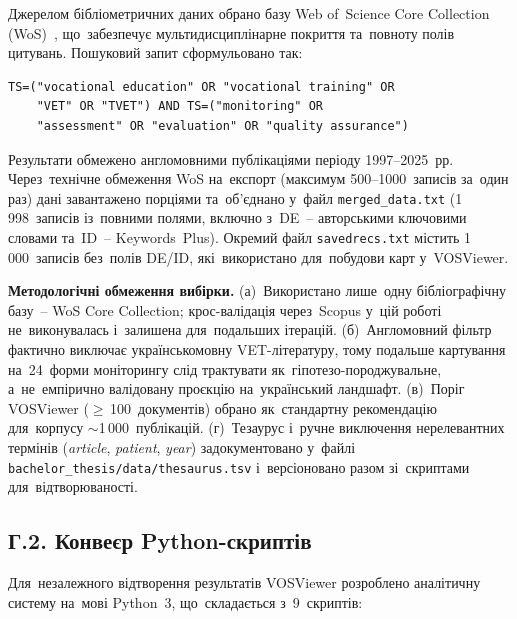 Джерелом бібліометричних даних обрано базу Web of~Science Core Collection (WoS)~\cite{Birkle2020}, що~забезпечує мультидисциплінарне покриття та~повноту полів цитувань. Пошуковий запит сформульовано так:

\begin{verbatim}
TS=("vocational education" OR "vocational training" OR
    "VET" OR "TVET") AND TS=("monitoring" OR
    "assessment" OR "evaluation" OR "quality assurance")
\end{verbatim}

Результати обмежено англомовними публікаціями періоду 1997--2025~рр. Через~технічне обмеження WoS на~експорт (максимум 500--1000~записів за~один раз) дані завантажено порціями та~об'єднано у~файл \texttt{merged\_data.txt} (1\,998~записів із~повними полями, включно з~DE~-- авторськими ключовими словами та~ID~-- Keywords~Plus). Окремий файл \texttt{savedrecs.txt} містить 1\,000~записів без~полів DE/ID, які~використано для~побудови карт у~VOSViewer.

\textbf{Методологічні обмеження вибірки.} (а)~Використано лише~одну бібліографічну базу~-- WoS Core Collection; крос-валідація через~Scopus у~цій роботі не~виконувалась і~залишена для~подальших ітерацій. (б)~Англомовний фільтр фактично виключає українськомовну VET-літературу, тому подальше картування на~24~форми моніторингу слід трактувати як~гіпотезо-породжувальне, а~не~емпірично валідовану проєкцію на~український ландшафт. (в)~Поріг VOSViewer ($\geq$\,100~документів) обрано як~стандартну рекомендацію~\cite{vanEck2014} для~корпусу $\sim$1\,000~публікацій. (г)~Тезаурус і~ручне виключення нерелевантних термінів (\textit{article}, \textit{patient}, \textit{year}) задокументовано у~файлі \texttt{bachelor\_thesis/data/thesaurus.tsv} і~версіоновано разом зі~скриптами для~відтворюваності.

\subsection*{Г.2. Конвеєр Python-скриптів}
\label{app:bibliometric-pipeline}

Для~незалежного відтворення результатів VOSViewer розроблено аналітичну систему на~мові Python~3, що~складається з~9~скриптів:

